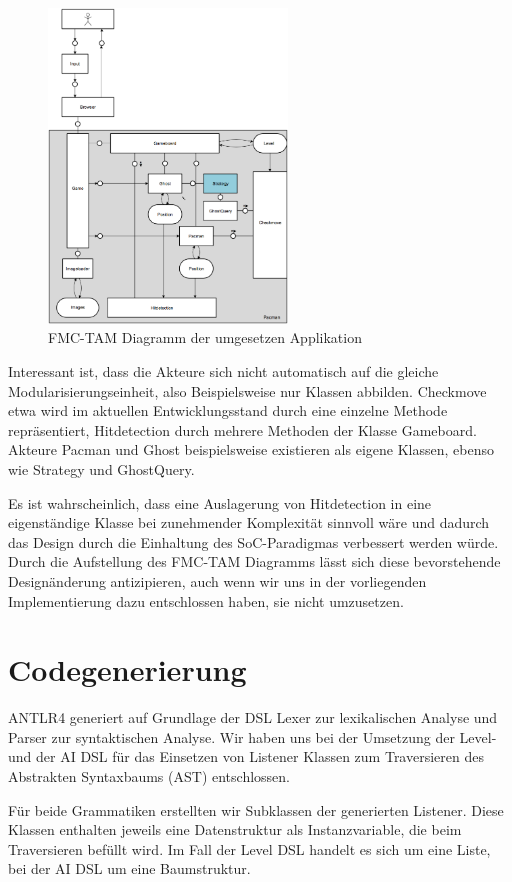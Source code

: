 \documentclass[conference]{IEEEtran}
\begin{document}
\begin{figure}[!t]
\centering
\includegraphics[width=2.5in]{tam.png}

\caption{FMC-TAM Diagramm der umgesetzen Applikation}
\label{fmc_tam}
\end{figure}

Interessant ist, dass die Akteure sich nicht automatisch auf die gleiche Modularisierungseinheit, also Beispielsweise nur  Klassen abbilden. Checkmove etwa wird im aktuellen Entwicklungsstand durch eine einzelne Methode repräsentiert, Hitdetection durch mehrere Methoden der Klasse Gameboard. Akteure Pacman und Ghost beispielsweise existieren als eigene Klassen, ebenso wie Strategy und GhostQuery.

Es ist wahrscheinlich, dass eine Auslagerung von Hitdetection in eine eigenständige Klasse bei zunehmender Komplexität sinnvoll wäre und dadurch das Design durch die Einhaltung des SoC-Paradigmas verbessert werden würde. Durch die Aufstellung des FMC-TAM Diagramms lässt sich diese bevorstehende Designänderung antizipieren, auch wenn wir uns in der vorliegenden Implementierung dazu entschlossen haben, sie nicht umzusetzen.

\section{Codegenerierung}
ANTLR4 generiert auf Grundlage der DSL Lexer zur lexikalischen Analyse und Parser zur syntaktischen Analyse.
Wir haben uns bei der Umsetzung der Level- und der AI DSL für  das Einsetzen von Listener Klassen zum Traversieren des Abstrakten Syntaxbaums (AST) entschlossen.

Für beide Grammatiken erstellten wir Subklassen der generierten Listener. Diese Klassen enthalten jeweils eine Datenstruktur als Instanzvariable, die beim Traversieren befüllt wird. Im Fall der Level DSL handelt es sich um eine Liste, bei der AI DSL um eine Baumstruktur.
\end{document}
